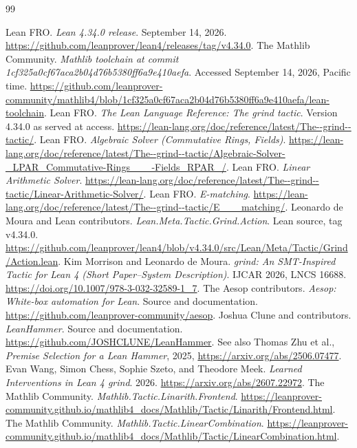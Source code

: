 \documentclass[11pt,letterpaper]{article}
\theoremstyle{definition}
\theoremstyle{remark}
\begin{document}
\newpage
\renewcommand{\refname}{Sources}
\begin{thebibliography}{99}
\raggedright
{}
 Lean FRO. \emph{Lean 4.34.0 release}. September 14, 2026. \url{https://github.com/leanprover/lean4/releases/tag/v4.34.0}.
 The Mathlib Community. \emph{Mathlib toolchain at commit 1cf325a0cf67aca2b04d76b5380ff6a9e410aefa}. Accessed September 14, 2026, Pacific time. \url{https://github.com/leanprover-community/mathlib4/blob/1cf325a0cf67aca2b04d76b5380ff6a9e410aefa/lean-toolchain}.
 Lean FRO. \emph{The Lean Language Reference: The grind tactic}. Version 4.34.0 as served at access. \url{https://lean-lang.org/doc/reference/latest/The--grind--tactic/}.
 Lean FRO. \emph{Algebraic Solver (Commutative Rings, Fields)}. \url{https://lean-lang.org/doc/reference/latest/The--grind--tactic/Algebraic-Solver-_LPAR_Commutative-Rings___-Fields_RPAR_/}.
 Lean FRO. \emph{Linear Arithmetic Solver}. \url{https://lean-lang.org/doc/reference/latest/The--grind--tactic/Linear-Arithmetic-Solver/}.
 Lean FRO. \emph{E-matching}. \url{https://lean-lang.org/doc/reference/latest/The--grind--tactic/E___matching/}.
 Leonardo de Moura and Lean contributors. \emph{Lean.Meta.Tactic.Grind.Action}. Lean source, tag v4.34.0. \url{https://github.com/leanprover/lean4/blob/v4.34.0/src/Lean/Meta/Tactic/Grind/Action.lean}.
 Kim Morrison and Leonardo de Moura. \emph{grind: An SMT-Inspired Tactic for Lean 4 (Short Paper--System Description)}. IJCAR 2026, LNCS 16688. \url{https://doi.org/10.1007/978-3-032-32589-1_7}.
 The Aesop contributors. \emph{Aesop: White-box automation for Lean}. Source and documentation. \url{https://github.com/leanprover-community/aesop}.
 Joshua Clune and contributors. \emph{LeanHammer}. Source and documentation. \url{https://github.com/JOSHCLUNE/LeanHammer}. See also Thomas Zhu et al., \emph{Premise Selection for a Lean Hammer}, 2025, \url{https://arxiv.org/abs/2506.07477}.
 Evan Wang, Simon Chess, Sophie Szeto, and Theodore Meek. \emph{Learned Interventions in Lean 4 grind}. 2026. \url{https://arxiv.org/abs/2607.22972}.
 The Mathlib Community. \emph{Mathlib.Tactic.Linarith.Frontend}. \url{https://leanprover-community.github.io/mathlib4_docs/Mathlib/Tactic/Linarith/Frontend.html}.
 The Mathlib Community. \emph{Mathlib.Tactic.LinearCombination}. \url{https://leanprover-community.github.io/mathlib4_docs/Mathlib/Tactic/LinearCombination.html}.

\end{thebibliography}
\end{document}
